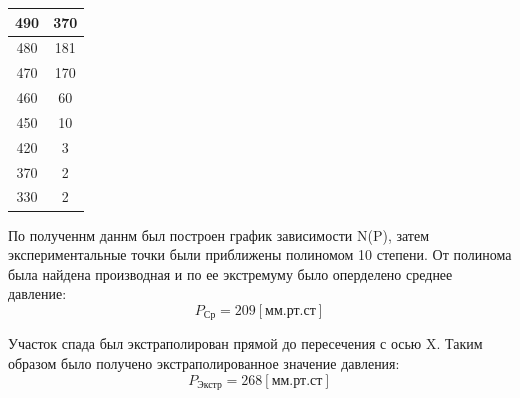 \documentclass[a4paper,12pt]{article} %
\begin{document}
\begin{table}[h!]
\begin{tabular}{|c|c|}
                490                 & 370                     \\ \hline
                480                 & 181                     \\ \hline
                470                 & 170                     \\ \hline
                460                 & 60                      \\ \hline
                450                 & 10                      \\ \hline
                420                 & 3                       \\ \hline
                370                 & 2                       \\ \hline
                330                 & 2                       \\ \hline
                \end{tabular}
            \end{table}\par
            По полученнм даннм был построен график зависимости N(P), затем экспериментальные точки были приближены полиномом 10 степени. 
            От полинома была найдена производная и по ее экстремуму было оперделено среднее давление:
            \begin{equation}
                P_\text{Ср} = 209 [\text{мм.рт.ст}]
            \end{equation}\par
            Участок спада был экстраполирован прямой до пересечения с осью X.
            Таким образом было получено экстраполированное значение давления:
            \begin{equation}
                P_\text{Экстр} = 268 [\text{мм.рт.ст}]
            \end{equation}\par
    \newpage
            
\end{document}
